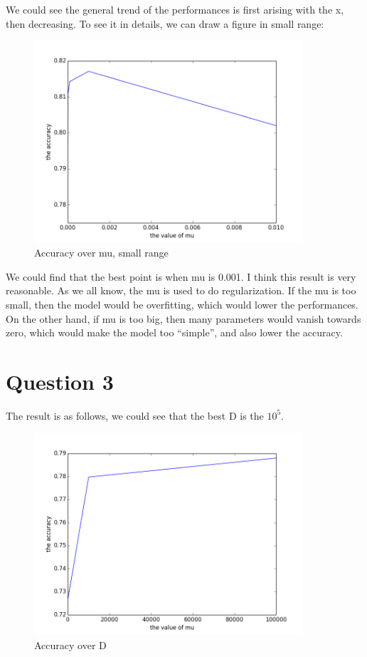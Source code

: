 \documentclass{article} %
\begin{document}
We could see the general trend of the performances is first arising with the x,
then decreasing. To see it in details, we can draw a figure in small range:

\begin{figure}[h]
\begin{center}
\includegraphics[width=10cm]{pic/q22.png}
\end{center}
\caption{Accuracy over mu, small range}
\end{figure}

We could find that the best point is when mu is 0.001. I think this result is
very reasonable. As we all know, the mu is used to do regularization. If the
mu is too small, then the model would be overfitting, which would lower the
performances. On the other hand, if mu is too big, then many parameters would
vanish towards zero, which would make the model too ``simple'', and also lower
the accuracy.



\section{Question 3}

The result is as follows, we could see that the best D is the $10^5$.

\begin{figure}[h]
\begin{center}
\includegraphics[width=10cm]{pic/q3.png}
\end{center}
\caption{Accuracy over D}
\end{figure}
\end{document}
